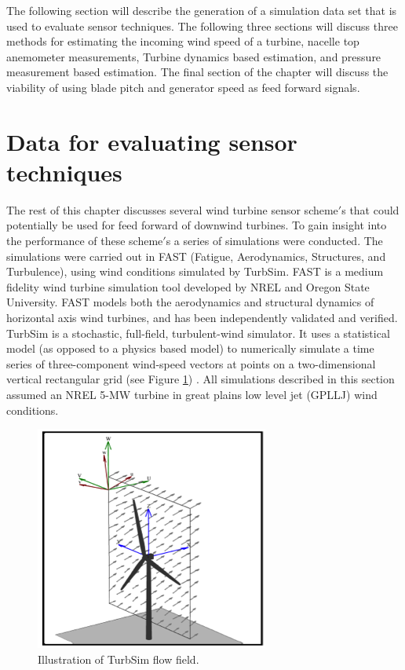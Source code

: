 The following section will describe the generation of a simulation data set that is used to evaluate sensor techniques. The following three sections will discuss three methods for estimating the incoming wind speed of a turbine, nacelle top anemometer measurements, Turbine dynamics based estimation, and pressure measurement based estimation.  The final section of the chapter will discuss the viability of using blade pitch and generator speed as feed forward signals.




\section{Data for evaluating sensor techniques} \label{section2-2}

The rest of this chapter discusses several wind turbine sensor scheme$'$s that could potentially be used for feed forward of downwind turbines. To gain insight into the performance of these scheme$'$s a series of simulations were conducted. The simulations were carried out in FAST (Fatigue, Aerodynamics, Structures, and Turbulence), using wind conditions simulated by TurbSim. FAST is a medium fidelity wind turbine simulation tool developed by NREL and Oregon State University. FAST models both the aerodynamics and structural dynamics of horizontal axis wind turbines, and has been independently validated and verified\cite{manjock2005}. TurbSim is a stochastic, full-field, turbulent-wind simulator. It uses a statistical model (as opposed to a physics based model) to numerically simulate a time series of three-component wind-speed vectors at points on a two-dimensional vertical rectangular grid (see Figure \ref{fig2-2}) \cite{jonkman2012}. All simulations described in this section assumed an NREL 5-MW turbine in great plains low level jet (GPLLJ) wind conditions.

\begin{figure}[htbp]
	\centering
		\includegraphics[width=.5\linewidth]{Figures/ch2Figures/fig2-2.png}
		
	\caption{Illustration of TurbSim flow field.\cite{jonkman2012}}
	\label{fig2-2}
\end{figure}

